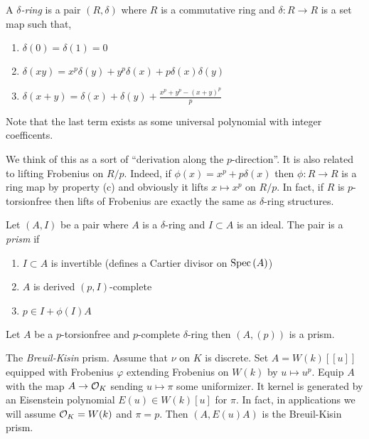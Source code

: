 \documentclass[12pt]{article}
\begin{document}
\begin{defn}
A $\delta$\textit{-ring} is a pair $(R, \delta)$ where $R$ is a commutative ring and $\delta : R \to R$ is a set map such that,
\begin{enumerate}
\item $\delta(0) = \delta(1) = 0$
\item $\delta(xy) = x^p \delta(y) + y^p \delta(x) + p \delta(x) \delta(y)$
\item $\delta(x + y) = \delta(x) + \delta(y) + \frac{x^p + y^p - (x+y)^p}{p}$
\end{enumerate}
Note that the last term exists as some universal polynomial with integer coefficents. 
\end{defn}

We think of this as a sort of ``derivation along the $p$-direction''. It is also related to lifting Frobenius on $R / p$. Indeed, if $\phi(x) = x^p + p \delta(x)$ then $\phi : R \to R$ is a ring map by property (c) and obviously it lifts $x \mapsto x^p$ on $R / p$. In fact, if $R$ is $p$-torsionfree then lifts of Frobenius are exactly the same as $\delta$-ring structures.

\begin{defn}
Let $(A, I)$ be a pair where $A$ is a $\delta$-ring and $I \subset A$ is an ideal. The pair is a \textit{prism} if
\begin{enumerate}
\item  $I \subset A$ is invertible (defines a Cartier divisor on $\mathrm{Spec}\left( A \right)$) 
\item $A$ is derived $(p,I)$-complete
\item $p \in I + \phi(I) A$
\end{enumerate}
\end{defn}

\begin{example}
Let $A$ be a $p$-torsionfree and $p$-complete $\delta$-ring then $(A, (p))$ is a prism.
\end{example}

\begin{example}
The \textit{Breuil-Kisin} prism. Assume that $\nu$ on $K$ is discrete. Set $A = W(k)[[u]]$ equipped with Frobenius $\varphi$ extending Frobenius on $W(k)$ by $u \mapsto u^p$. Equip $A$ with the map $A \to \mathcal{O}_K$ sending $u \mapsto \pi$ some uniformizer. It kernel is generated by an Eisenstein polynomial $E(u) \in W(k)[u]$ for $\pi$. In fact, in applications we will assume $\mathcal{O}_K = W(k)$ and $\pi = p$. Then $(A, E(u) A)$ is the Breuil-Kisin prism.
\end{example}
\end{document}
